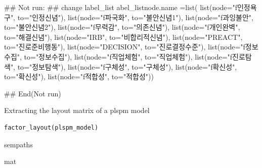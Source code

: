 \documentclass[a4paper]{book}
\begin{document}
%
\begin{Examples}
\begin{ExampleCode}

\#\# Not run: 
## change label_list
abel_listnode.name =list(
  list(node="f인정욕구", to="인정신념"),
  list(node="f파국화",  to="불안신념1"),
  list(node="f과잉불안", to="불안신념2"),
  list(node="f무력감",  to="의존신념"),
  list(node="f개인완벽", to="해결신념"),
  list(node="IRB",  to="비합리적신념"),
  list(node="PREACT",  to="진로준비행동"),
  list(node="DECISION",  to="진로결정수준"),
  list(node="f정보수집",  to="정보수집"),
  list(node="f직업체험",  to="직업체험"),
  list(node="f진로탐색",  to="정보탐색"),
  list(node="f구체성",  to="구체성"),
  list(node="f확신성",  to="확신성"),
  list(node="f적합성",  to="적합성"))

## End(Not run)


\end{ExampleCode}
\end{Examples}
%
\begin{Description}
Extracting the layout matrix of a plspm model
\end{Description}
%
\begin{Usage}
\begin{verbatim}
factor_layout(plspm_model)
\end{verbatim}
\end{Usage}
%
\begin{Arguments}
\begin{ldescription}
\item[\code{plspm\_model}] sempaths
\end{ldescription}
\end{Arguments}
%
\begin{Value}
mat
\end{Value}
%
\end{document}
